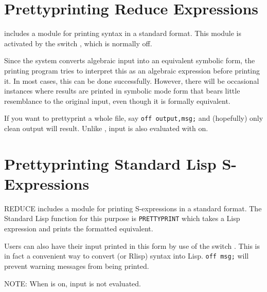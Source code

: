 \section{Prettyprinting Reduce Expressions}
\hypertarget{switch:PRET}{}

{\REDUCE} includes a module for printing {\REDUCE} syntax in a standard
format.  This module is activated by the switch ,
 which is normally off.

Since the system converts algebraic input into an equivalent symbolic form,
the printing program tries to interpret this as an algebraic expression
before printing it. In most cases, this can be done successfully. However,
there will be occasional instances where results are printed in symbolic
mode form that bears little resemblance to the original input, even though
it is formally equivalent.

\hypertarget{switch:MSG}{}
If you want to prettyprint a whole file, say \texttt{off output,msg;}
 and (hopefully) only clean output will result.  Unlike 
, input is also evaluated with 
 on.

\section{Prettyprinting Standard Lisp S-Expressions}

REDUCE includes a module for printing
S-expressions in a standard format.  The Standard Lisp function for this
purpose is \texttt{PRETTYPRINT} which takes a Lisp
expression and prints the formatted equivalent.

Users can also have their {\REDUCE} input printed in this form by use of
the switch . This is in fact a convenient way to
convert {\REDUCE} (or Rlisp) syntax into Lisp. \texttt{off msg;} will prevent
warning messages from being printed.

NOTE: When  is on, input is not evaluated.

